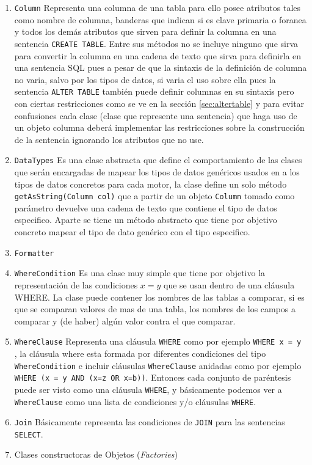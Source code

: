 \begin{enumerate}

\item \verb=Column= Representa una columna de una tabla para ello posee atributos tales como nombre de columna, banderas que indican si es clave primaria o foranea y todos los demás atributos que sirven para definir la columna en una sentencia \verb=CREATE TABLE=. Entre sus métodos no se incluye ninguno que sirva para convertir la columna en una cadena  de texto que sirva para definirla en una sentencia SQL pues a pesar de que la sintaxis de la definición de columna no varia, salvo por los tipos de datos, si varia el uso sobre ella pues la sentencia \verb=ALTER TABLE= también puede definir columnas en su sintaxis pero con ciertas restricciones como se ve en la sección \ref{sec:altertable} y para evitar confusiones cada clase (clase que represente una sentencia) que haga uso de un objeto columna deberá implementar las restricciones sobre la construcción de la sentencia ignorando los atributos que no use. 

\item \verb=DataTypes= Es una clase abstracta que define el comportamiento de las clases que serán encargadas de mapear los tipos de datos genéricos usados en \cc a los tipos de datos concretos para cada motor, la clase define un solo método \verb=getAsString(Column col)= que a partir de un objeto \verb=Column= tomado como parámetro devuelve una cadena de texto que contiene el tipo de datos especifico. Aparte se tiene un método abstracto que tiene por objetivo concreto mapear el tipo de dato genérico con el tipo especifico.  

\item \verb=Formatter=

\item \verb=WhereCondition= Es una clase muy simple que tiene por objetivo la representación de las condiciones $ x = y $ que se usan dentro de una cláusula WHERE. La clase puede contener los nombres de las tablas a comparar, si es que se comparan valores de mas de una tabla, los nombres de los campos a comparar y (de haber) algún valor contra el que comparar.

\item \verb=WhereClause=  Representa una cláusula \verb=WHERE= como por ejemplo \verb|WHERE x = y | , la cláusula where esta formada por diferentes condiciones del tipo \verb=WhereCondition= e incluir cláusulas \verb=WhereClause= anidadas como por ejemplo \verb|WHERE (x = y AND (x=z OR x=b))|. Entonces cada conjunto de paréntesis puede ser visto como una cláusula \verb=WHERE=, y básicamente podemos ver a \verb=WhereClause= como una lista de condiciones y/o cláusulas \verb=WHERE=.

\item \verb=Join= Básicamente representa las condiciones de \verb=JOIN= para las sentencias \verb=SELECT=.

\item Clases constructoras de Objetos (\textit{Factories})

\end{enumerate}






